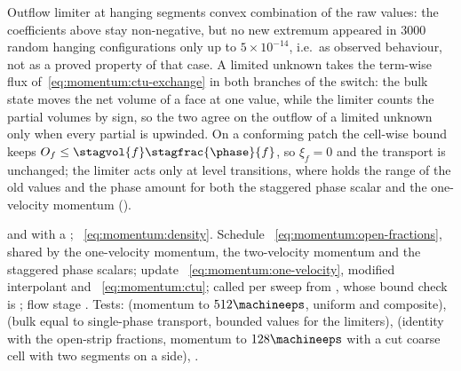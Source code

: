 \begin{deviation}{Outflow limiter at hanging segments}
convex combination of the raw values: the coefficients above stay
non-negative, but no new extremum appeared in $3000$ random hanging
configurations only up to $5\times10^{-14}$, i.e.\ as observed behaviour, not
as a proved property of that case. A limited unknown takes the term-wise flux
of~\cref{eq:momentum:ctu-exchange} in both branches of the switch: the bulk
state moves the net volume of a face at one value, while the limiter counts
the partial volumes by sign, so the two agree on the outflow of a limited
unknown only when every partial is upwinded. On a conforming patch the
cell-wise bound keeps
$O_f\le\stagvol{f}\stagfrac{\phase}{f}$, so $\xi_f=0$ and the
transport is unchanged; the limiter acts only at level transitions, where
holds the range of the old values and the phase amount for both the staggered
phase scalar and the one-velocity momentum ().
\end{deviation}

\begin{implnote}
 and
with a ;
~\cref{eq:momentum:density}. Schedule
~\cref{eq:momentum:open-fractions},
shared by the one-velocity momentum, the two-velocity momentum and the
staggered phase scalars;
update ~\cref{eq:momentum:one-velocity},
modified interpolant 
and ~\cref{eq:momentum:ctu};
called per sweep from , whose bound
check is ; flow stage
. Tests:
(momentum to $512\machineeps$, uniform and composite),
(bulk equal to single-phase transport, bounded values for the limiters),
(identity with the open-strip fractions, momentum to $128\machineeps$ with a
cut coarse cell with two segments on a side),
.
\end{implnote}

